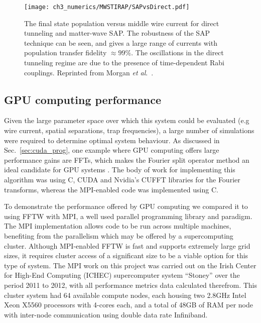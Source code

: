 \begin{figure}[tb]
    \centering
  \texttt{[image: ch3\_numerics/MWSTIRAP/SAPvsDirect.pdf]}
  \caption{The final state population versus middle wire current for direct tunneling and matter-wave SAP. The robustness of the SAP technique can be seen, and gives a large range of currents with population transfer fidelity $\approx 99 \%$. The oscillations in the direct tunneling regime are due to the presence of time-dependent Rabi couplings. Reprinted from Morgan {\textit{et al}.}~\cite{AO:Morgan_pra_2013}.}
  \label{fig:DIRVSMWSTIRAP}
\end{figure}

\subsection{GPU computing performance}
Given the large parameter space over which this system could be evaluated (e.g wire current, spatial separations, trap frequencies), a large number of simulations were required to determine optimal system behaviour. As discussed in Sec.~\ref{sec:cuda_prog}, one example where GPU computing offers large performance gains are FFTs, which makes the Fourier split operator method an ideal candidate for GPU systems \cite{Num:Bauke_cpc_2011}. The body of work for implementing this algorithm was using C, CUDA and Nvidia's CUFFT libraries for the Fourier transforms, whereas the MPI-enabled code was implemented using C.

To demonstrate the performance offered by GPU computing we compared it to using FFTW with MPI, a well used parallel programming library and paradigm. The MPI implementation allows code to be run across multiple machines, benefiting from the parallelism which may be offered by a supercomputing cluster. Although MPI-enabled FFTW is fast and supports extremely large grid sizes, it requires cluster access of a significant size to be a viable option for this type of system. The MPI work on this project was carried out on the Irish Center for High-End Computing (ICHEC) supercomputer system ``Stoney'' \cite{Ichec_stoney} over the period 2011 to 2012, with all performance metrics data calculated therefrom. This cluster system had 64 available compute nodes, each housing two 2.8GHz Intel Xeon X5560 processors with 4-cores each, and a total of 48GB of RAM per node with inter-node communication using double data rate Infiniband.

